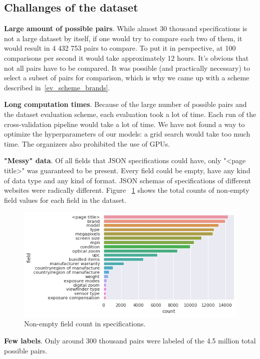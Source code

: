 \documentclass[sigconf]{acmart}
\begin{document}
\subsection{Challanges of the dataset}

\textbf{Large amount of possible pairs}. While almost 30 thousand specifications is not a large dataset by itself, if one would try to compare each two of them, it would result in 4 432 753 pairs to compare. To put it in perspective, at 100 comparisons per second it would take approximately 12 hours. It's obvious that not all pairs have to be compared. It was possible (and practically necessary) to select a subset of pairs for comparison, which is why we came up with a scheme described in~\ref{ev_scheme_brands}.

\textbf{Long computation times}. Because of the large number of possible pairs and the dataset evaluation scheme, each evaluation took a lot of time. Each run of the cross-validation pipeline would take a lot of time. We have not found a way to optimize the hyperparameters of our models: a grid search would take too much time. The organizers also prohibited the use of GPUs.

\textbf{"Messy" data}. Of all fields that JSON specifications could have, only "<page title>" was guaranteed to be present. Every field could be empty, have any kind of data type and any kind of format. JSON schemas of specifications of different websites were radically different. Figure ~\ref{fig:filled_fields} shows the total counts of non-empty field values for each field in the dataset. 

\begin{figure}
\centering
\includegraphics[width=0.9\columnwidth]{../figures/filled_fields.png}
\caption{Non-empty field count in specifications.}
\label{fig:filled_fields}
\end{figure} 

\textbf{Few labels}. Only around 300 thousand pairs were labeled of the 4.5 million total possible pairs. 
\end{document}
